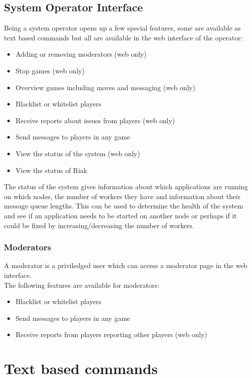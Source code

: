 \documentclass[11pt,a4paper]{report}
\begin{document}
\section{System Operator Interface}
Being a system operator opens up a few special features, some are available as
text based commands but all are available in the web interface of the operator:
\begin{itemize}
\item Adding or removing moderators (web only)
\item Stop games (web only)
\item Overview games including moves and messaging (web only)
\item Blacklist or whitelist players
\item Receive reports about issues from players (web only)
\item Send messages to players in any game
\item View the status of the system (web only)
\item View the status of Riak
\end{itemize}

The status of the system gives information about which applications are running
on which nodes, the number of workers they have and information about their
message queue lengths. This can be used to determine the health of the system
and see if an application needs to be started on another node or perhaps if it
could be fixed by increasing/decreasing the number of workers.

\subsection{Moderators}
A moderator is a priviledged user which can access a moderator page in the web
interface.\\

The following features are available for moderators:
\begin{itemize}
\item Blacklist or whitelist players
\item Send messages to players in any game
\item Receive reports from players reporting other players (web only)
\end{itemize}

\chapter{Text based commands}
\label{sec:textbasedcommands}
\end{document}

